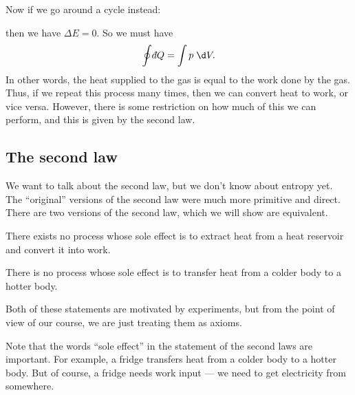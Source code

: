 \documentclass[a4paper]{article}
\def\di{{\mathchar'26\mkern-12mu d}}
\begin{document}
Now if we go around a cycle instead:
\begin{center}
\end{center}
then we have $\Delta E = 0$. So we must have
\[
  \oint \di Q = \int p \;\d V.
\]
In other words, the heat supplied to the gas is equal to the work done by the gas. Thus, if we repeat this process many times, then we can convert heat to work, or vice versa. However, there is some restriction on how much of this we can perform, and this is given by the second law.

\subsection{The second law}
We want to talk about the second law, but we don't know about entropy yet. The ``original'' versions of the second law were much more primitive and direct. There are two versions of the second law, which we will show are equivalent.

\begin{law}
  There exists no process whose sole effect is to extract heat from a heat reservoir and convert it into work.
\end{law}

\begin{law}
  There is no process whose sole effect is to transfer heat from a colder body to a hotter body.
\end{law}
Both of these statements are motivated by experiments, but from the point of view of our course, we are just treating them as axioms.

Note that the words ``sole effect'' in the statement of the second laws are important. For example, a fridge transfers heat from a colder body to a hotter body. But of course, a fridge needs work input --- we need to get electricity from somewhere.
\end{document}
